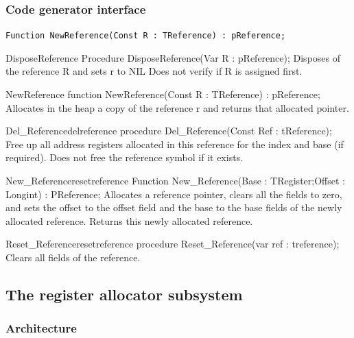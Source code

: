 \documentclass [a4paper,12pt]{article}
\begin{document}
\subsubsection{Code generator interface}
\label{subsubsec:mylabel28}

\lstinline!Function NewReference(Const R : TReference) : pReference;!

\begin{procedure}{DisposeReference}
\Declaration
Procedure DisposeReference(Var R : pReference);
\Description
Disposes of the reference \textsf{R} and sets r to \textsf{NIL}
\Notes
Does not verify if \textsf{R} is assigned first.
\end{procedure}

\begin{function}{NewReference}
\Declaration
function NewReference(Const R : TReference) : pReference;
\Description
Allocates in the heap a copy of the reference \textsf{r} and returns that
allocated pointer.
\end{function}

\begin{functionl}{Del{\_}Reference}{delreference}
\Declaration
procedure Del{\_}Reference(Const Ref : tReference);
\Description
Free up all address registers allocated in this reference for the index and
base (if required).
\Notes
Does not free the reference symbol if it exists.
\end{functionl}

\begin{functionl}{New{\_}Reference}{resetreference}
\Declaration
Function New{\_}Reference(Base : TRegister;Offset : Longint) : PReference;
\Description
Allocates a reference pointer, clears all the fields to zero, and sets the
offset to the offset field and the base to the base fields of the newly
allocated reference. Returns this newly allocated reference.
\end{functionl}

\begin{procedurel}{Reset{\_}Reference}{resetreference}
\Declaration
procedure Reset{\_}Reference(var ref : treference);
\Description
Clears all fields of the reference.
\end{procedurel}

\subsection{The register allocator subsystem}
\label{subsec:mylabel7}

\subsubsection{Architecture}
\label{subsubsec:architecture}
\end{document}
